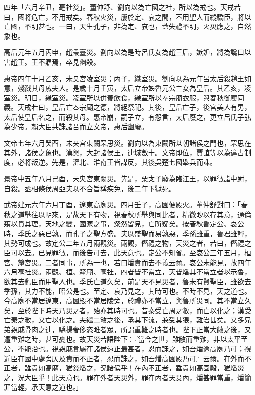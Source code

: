\begin{pinyinscope}
四年「六月辛丑，亳社災」。董仲舒、劉向以為亡國之社，所以為戒也。天戒若曰，國將危亡，不用戒矣。春秋火災，屢於定、哀之間，不用聖人而縱驕臣，將以亡國，不明甚也。一曰，天生孔子，非為定、哀也，蓋失禮不明，火災應之，自然象也。

高后元年五月丙申，趙叢臺災。劉向以為是時呂氏女為趙王后，嫉妒，將為讒口以害趙王。王不寤焉，卒見幽殺。

惠帝四年十月乙亥，未央宮凌室災；丙子，織室災。劉向以為元年呂太后殺趙王如意，殘戮其母戚夫人。是歲十月壬寅，太后立帝姊魯元公主女為皇后。其乙亥，凌室災。明日，織室災。凌室所以供養飲食，織室所以奉宗廟衣服，與春秋御廩同義。天戒若曰，皇后亡奉宗廟之德，將絕祭祀。其後，皇后亡子，後宮美人有男，太后使皇后名之，而殺其母。惠帝崩，嗣子立，有怨言，太后廢之，更立呂氏子弘為少帝。賴大臣共誅諸呂而立文帝，惠后幽廢。

文帝七年六月癸酉，未央宮東闕罘思災。劉向以為東闕所以朝諸侯之門也，罘思在其外，諸侯之象也。漢興，大封諸侯王，連城數十。文帝即位，賈誼等以為違古制度，必將叛逆。先是，濟北、淮南王皆謀反，其後吳楚七國舉兵而誅。

景帝中五年八月己酉，未央宮東闕災。先是，栗太子廢為臨江王，以罪徵詣中尉，自殺。丞相條侯周亞夫以不合旨稱疾免，後二年下獄死。

武帝建元六年六月丁酉，遼東高廟災。四月壬子，高園便殿火。董仲舒對曰：「春秋之道舉往以明來，是故天下有物，視春秋所舉與同比者，精微眇以存其意，通倫類以貫其理，天地之變，國家之事，粲然皆見，亡所疑矣。按春秋魯定公、哀公時，季氏之惡已孰，而孔子之聖方盛。夫以盛聖而易孰惡，季孫雖重，魯君雖輕，其勢可成也。故定公二年五月兩觀災。兩觀，僭禮之物，天災之者，若曰，僭禮之臣可以去。已見罪徵，而後告可去，此天意也。定公不知省。至哀公三年五月，桓宮、釐宮災。二者同事，所為一也，若曰燔貴而去不義云爾。哀公未能見，故四年六月亳社災。兩觀、桓、釐廟、亳社，四者皆不當立，天皆燔其不當立者以示魯，欲其去亂臣而用聖人也。季氏亡道久矣，前是天不見災者，魯未有賢聖臣，雖欲去季孫，其力不能，昭公是也。至定、哀乃見之，其時可也。不時不見，天之道也。今高廟不當居遼東，高園殿不當居陵旁，於禮亦不當立，與魯所災同。其不當立久矣，至於陛下時天乃災之者，殆亦其時可也。昔秦受亡周之敝，而亡以化之；漢受亡秦之敝，又亡以化之。夫繼二敝之後，承其下流，兼受其猥，難治甚矣。又多兄弟親戚骨肉之連，驕揚奢侈恣睢者眾，所謂重難之時者也。陛下正當大敝之後，又遭重難之時，甚可憂也。故天災若語陛下：『當今之世，雖敝而重難，非以太平至公，不能治也。視親戚貴屬在諸侯遠正最甚者，忍而誅之，如吾燔遼高廟乃可；視近臣在國中處旁仄及貴而不正者，忍而誅之，如吾燔高園殿乃可』云爾。在外而不正者，雖貴如高廟，猶災燔之，況諸侯乎！在內不正者，雖貴如高園殿，猶燔災之，況大臣乎！此天意也。罪在外者天災外，罪在內者天災內，燔甚罪當重，燔簡罪當輕，承天意之道也。」


\end{pinyinscope}
